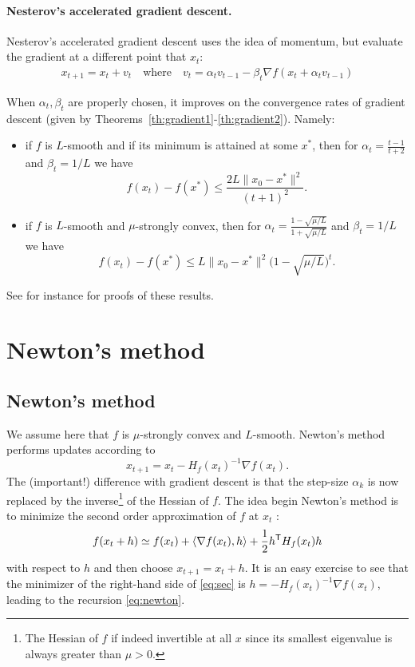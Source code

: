 \documentclass[11pt,nocut]{article}
\begin{document}
\paragraph{Nesterov's accelerated gradient descent.}

Nesterov's accelerated gradient descent uses the idea of momentum, but evaluate the gradient at a different point that $x_t$:
\begin{align*}
	x_{t+1} = x_t + v_t
	\quad \text{where} \quad
	v_t = \alpha_t v_{t-1} - \beta_t \nabla f(x_{t} + \alpha_t v_{t-1})
\end{align*}

When $\alpha_t,\beta_t$ are properly chosen, it improves on the convergence rates of gradient descent (given by Theorems~\ref{th:gradient1}-\ref{th:gradient2}). Namely:
\begin{itemize}
	\item if $f$ is $L$-smooth and if its minimum is attained at some $x^*$, then for $\alpha_t = \frac{t-1}{t+2}$ and $\beta_t = 1/L$ we have
		$$
		f(x_t) - f(x^*) \leq \frac{2L \|x_0-x^*\|^2}{(t+1)^2}.
		$$
	\item if $f$ is $L$-smooth and $\mu$-strongly convex, then for $\alpha_t = \frac{1-\sqrt{\mu/L}}{1+\sqrt{\mu/L}}$ and $\beta_t = 1/L$ we have
		$$
		f(x_t) - f(x^*) \leq L \|x_0-x^*\|^2 \Big(1-\sqrt{\mu/L}\Big)^t.
		$$
\end{itemize}
See for instance \cite{schmidt2011convergence} for proofs of these results.


\section{Newton's method}

\subsection{Newton's method}
We assume here that $f$ is $\mu$-strongly convex and $L$-smooth.
Newton's method performs updates according to
\begin{equation}\label{eq:newton}
	x_{t+1} = x_t - H_f(x_t)^{-1} \nabla f(x_t).
\end{equation}
The (important!) difference with gradient descent is that the step-size $\alpha_k$ is now replaced by the inverse\footnote{The Hessian of $f$ if indeed invertible at all $x$ since its smallest eigenvalue is always greater than $\mu >0$.} of the Hessian of $f$. The idea begin Newton's method is to minimize the second order approximation of $f$ at $x_t$ :
\begin{equation}\label{eq:sec}
	f(x_t+h) \simeq f(x_t) + \langle \nabla f(x_t), h \rangle + \frac{1}{2} h^{{\sf T}} H_f(x_t) h
\end{equation}
with respect to $h$ and then choose $x_{t+1} = x_t + h$. It is an easy exercise to see that the minimizer of the right-hand side of \eqref{eq:sec} is $h=- H_f(x_t)^{-1} \nabla f(x_t)$, leading to the recursion \eqref{eq:newton}.
\\
\end{document}
